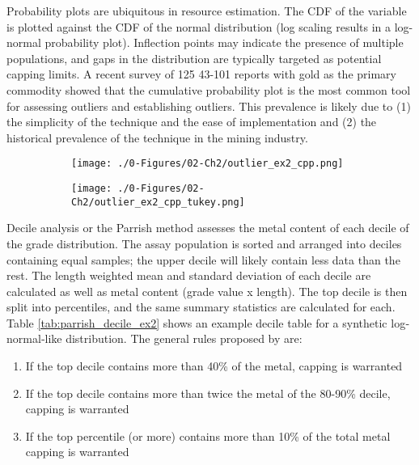 Probability plots are ubiquitous in resource estimation. The \gls{CDF} of the variable is plotted against the \gls{CDF} of the normal distribution (log scaling results in a log-normal probability plot). Inflection points may indicate the presence of multiple populations, and gaps in the distribution are typically targeted as potential capping limits. A recent survey of 125 43-101 reports with gold as the primary commodity showed that the cumulative probability plot is the most common tool for assessing outliers and establishing outliers. This prevalence is likely due to (1) the simplicity of the technique and the ease of implementation and (2) the historical prevalence of the technique in the mining industry.

\begin{figure}[!htb]
    \begin{subfigure}{0.5\textwidth}
        \centering
        \texttt{[image: ./0-Figures/02-Ch2/outlier\_ex2\_cpp.png]}
    \end{subfigure}
    \begin{subfigure}{0.5\textwidth}
        \centering
        \texttt{[image: ./0-Figures/02-Ch2/outlier\_ex2\_cpp\_tukey.png]}
    \end{subfigure}
    \caption{}
    \label{fig:cpp}
\end{figure}

Decile analysis or the Parrish method \citep{parrish1997geologist} assesses the metal content of each decile of the grade distribution. The assay population is sorted and arranged into deciles containing equal samples; the upper decile will likely contain less data than the rest. The length weighted mean and standard deviation of each decile are calculated as well as metal content (grade value x length). The top decile is then split into percentiles, and the same summary statistics are calculated for each. Table \ref{tab:parrish_decile_ex2} shows an example decile table for a synthetic log‐normal‐like distribution. The general rules proposed by \cite{parrish1997geologist} are:
\begin{enumerate}[noitemsep]
    \item If the top decile contains more than 40\% of the metal, capping is warranted
    \item If the top decile contains more than twice the metal of the 80-90\% decile, capping is warranted
    \item If the top percentile (or more) contains more than 10\% of the total metal capping is warranted
\end{enumerate}

